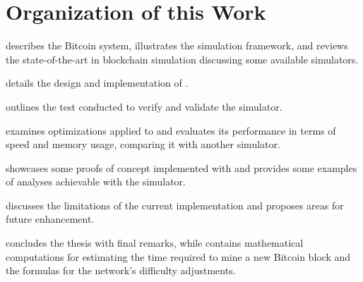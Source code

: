 \section{Organization of this Work}\label{sec:organization}

 describes the Bitcoin system, illustrates the \omnetpp{}
simulation framework, and reviews the state-of-the-art in blockchain simulation
discussing some available simulators.

 details the design and implementation of \iblock{}.

 outlines the test conducted to verify and validate the
simulator.

 examines optimizations applied to \iblock{} and
evaluates its performance in terms of speed and memory usage, comparing it
with another simulator.

 showcases some proofs of concept implemented with \iblock{}
and provides some examples of analyses achievable with the simulator.

 discusses the limitations of the current \iblock{}
implementation and proposes areas for future enhancement.

 concludes the thesis with final remarks, while
 contains mathematical computations for estimating
the time required to mine a new Bitcoin block and the formulas for the
network's difficulty adjustments.
